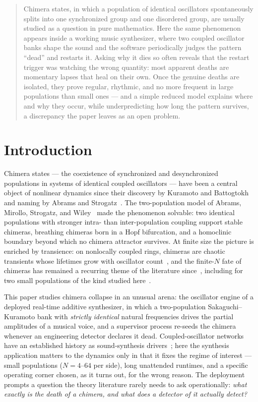 \documentclass[aip,preprint,amsmath,amssymb]{revtex4-2}
\begin{document}
\begin{quotation}
\noindent Chimera states, in which a population of identical oscillators
spontaneously splits into one synchronized group and one disordered group, are
usually studied as a question in pure mathematics. Here the same phenomenon appears
inside a working music synthesizer, where two coupled oscillator banks shape the
sound and the software periodically judges the pattern ``dead'' and restarts it.
Asking why it dies so often reveals that the restart trigger was watching the wrong
quantity: most apparent deaths are momentary lapses that heal on their own. Once the
genuine deaths are isolated, they prove regular, rhythmic, and no more frequent in
large populations than small ones --- and a simple reduced model explains where and
why they occur, while underpredicting how long the pattern survives, a discrepancy
the paper leaves as an open problem.
\end{quotation}

\section{Introduction}\label{sec:intro}

Chimera states --- the coexistence of synchronized and desynchronized populations in
systems of identical coupled oscillators --- have been a central object of nonlinear
dynamics since their discovery by Kuramoto and Battogtokh~\cite{kb2002} and naming by
Abrams and Strogatz~\cite{as2004}. The two-population model of Abrams, Mirollo,
Strogatz, and Wiley~\cite{abrams2008} made the phenomenon solvable: two identical
populations with stronger intra- than inter-population coupling support stable
chimeras, breathing chimeras born in a Hopf bifurcation, and a homoclinic boundary
beyond which no chimera attractor survives. At finite size the picture is enriched by
transience: on nonlocally coupled rings, chimeras are chaotic transients whose
lifetimes grow with oscillator count~\cite{wo2011}, and the finite-$N$ fate of
chimeras has remained a recurring theme of the literature
since~\cite{pa2015,om2018}, including for two small populations of the kind
studied here~\cite{panaggio2016}.

This paper studies chimera collapse in an unusual arena: the oscillator engine of a
deployed real-time additive synthesizer, in which a two-population
Sakaguchi--Kuramoto bank with \emph{strictly identical} natural frequencies drives
the partial amplitudes of a musical voice, and a supervisor process re-seeds the
chimera whenever an engineering detector declares it dead. Coupled-oscillator
networks have an established history as sound-synthesis drivers~\cite{lem2019,lemsmc};
here the synthesis application matters to the dynamics only in that it fixes the
regime of interest --- small populations ($N = 4$--$64$ per side), long unattended
runtimes, and a specific operating corner chosen, as it turns out, for the wrong
reason. The deployment prompts a question the theory literature rarely needs to ask
operationally: \emph{what exactly is the death of a chimera, and what does a detector
of it actually detect?}
\end{document}
